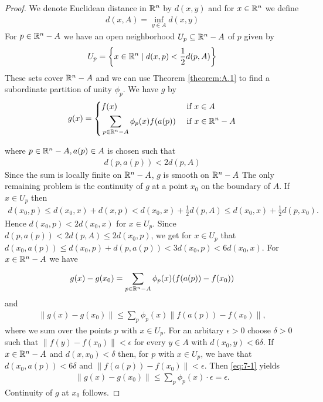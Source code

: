 \begin{proof}
  We denote Euclidean distance in ${\mathbb{R}}^n$ by $d(x, y)$ and for $x\in{\ensuremath{\mathbb{R}}}^n$ we define 
  \begin{align*}
    d(x, A) = \inf_{y\in A} d(x, y)
  \end{align*}
  For $p\in{\ensuremath{\mathbb{R}}}^n-A$ we have an open neighborhood $U_p\subseteq{\ensuremath{\mathbb{R}}}^n-A$ of $p$ given by 
  \begin{align*}
    U_p = \left\{x\in{\ensuremath{\mathbb{R}}}^n\mid d(x, p)< \frac12d(p, A)\right\}
  \end{align*}
  These sets cover ${\mathbb{R}}^n-A$ and we can use Theorem \ref{theorem:A.1} to find a subordinate
  partition of unity $\phi_p$. We have $g$ by 
  \begin{align*}
    g(x) = \left\{\begin{aligned}
      & f(x) && \text{ if } x\in A \\
      & \sum_{p\in{\ensuremath{\mathbb{R}}}^n-A}\phi_p(x)f(a(p)) && \text{ if } x\in{\ensuremath{\mathbb{R}}}^n-A
    \end{aligned}\right.
  \end{align*}

  where $p\in{\ensuremath{\mathbb{R}}}^n - A, a(p)\in A$ is chosen such that 
  \begin{align*}
    d(p, a(p))< 2d(p, A)
  \end{align*}
  Since the sum is locally finite on ${\mathbb{R}}^n-A$, $g$ is smooth on ${\mathbb{R}}^n-A$
  The only remaining problem is the continuity of $g$ at a point $x_0$ on the boundary
  of $A$. If $x\in U_p$ then
  \begin{align*}
    d(x_0, p) 
      \le d(x_0, x) + d(x, p)
      < d(x_0, x) + \frac12d(p, A)
      \le d(x_0, x) + \frac12d(p, x_0).
  \end{align*}
  Hence $d(x_0, p)<2d(x_0, x)$ for $x\in U_p$. Since $d(p, a(p))<2d(p, A)\le 2d(x_0, p)$, we get 
  for $x\in U_p$ that $d(x_0, a(p))\le d(x_0, p) + d(p, a(p))<3d(x_0, p)<6d(x_0, x)$. For $x\in{\ensuremath{\mathbb{R}}}^n-A$
  we have 
  \begin{align*}
    g(x) - g(x_0)
    = \sum_{p\in{\ensuremath{\mathbb{R}}}^n-A}^{}{\phi_p(x)(f(a(p)) - f(x_0))}
  \end{align*}
  and 
  \begin{align}\label{eq:7-1}
    \|g(x)-g(x_0)\| \le \sum_{p}^{}{\phi_p(x) \|f(a(p)) - f(x_0)\|},
  \end{align}
  where we sum over the points $p$ with $x\in U_p$. 
  For an arbitary $\epsilon>0$ choose $\delta >0$ such that $\|f(y)-f(x_0)\|<\epsilon$ for every 
  $y\in A$ with $d(x_0, y)<6\delta$. If $x\in{\ensuremath{\mathbb{R}}}^n-A$ and $d(x, x_0)<\delta$ then, for $p$ with 
  $x\in U_p$, we have that $d(x_0, a(p))<6\delta$ and $\|f(a(p)) - f(x_0)\|<\epsilon$. Then 
  \eqref{eq:7-1} yields
  \begin{align*}
    \|g(x) - g(x_0)\| \le \sum_{p}^{}{\phi_p(x)\cdot\epsilon} = \epsilon.
  \end{align*}
  Continuity of $g$ at $x_0$ follows.
\end{proof}

